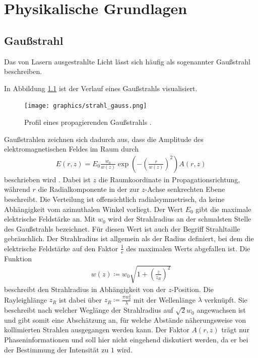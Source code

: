 \documentclass[
class=book,
accentcolor=1b,
custommargins=geometry,
fontsize=11pt,
thesis={type=Versuchsanleitung},
ruledheaders=all,
headline=false,
instbox=false,
marginpar=false,
title=small,
ignore-missing-data=true,
twoside=false,
pdfa=false %
]{apqpub}
\begin{document}
	\tableofcontents
	
	\mainmatter
	\setcounter{page}{1}
	\chapter{Physikalische Grundlagen}
	\section{Gaußstrahl}
Das von Lasern ausgestrahlte Licht lässt sich häufig als sogenannter Gaußstrahl beschreiben.

In Abbildung \ref{fig:gauss} ist der Verlauf eines Gaußstrahls visualisiert.
\begin{figure}[H]
\centering
	\texttt{[image: graphics/strahl\_gauss.png]}
\caption{Profil eines propagierenden Gaußstrahls \protect\cite{gauss}.}
\label{fig:gauss}
\end{figure}
Gaußstrahlen zeichnen sich dadurch aus, dass die Amplitude des elektromagnetischen Feldes im Raum durch 
\begin{align*}
E \left (r, z\right) = E_0 \frac{w_0}{w\left( z \right)} 
\exp \left( - \left( \frac{r}{w \left( z \right)} \right)^2 \right) 
A \left( r, z \right)
\end{align*}
beschrieben wird \cite[S. 50 -- 52]{Meschede}.
Dabei ist $z$ die Raumkoordinate in Propagationsrichtung, während $r$ die Radialkomponente in der zur $z$-Achse senkrechten Ebene beschreibt.
Die Verteilung ist offensichtlich radialsymmetrisch, da keine Abhängigkeit vom azimuthalen Winkel vorliegt.
Der Wert $E_0$ gibt die maximale elektrische Feldstärke an.
Mit $w_0$ wird der Strahlradius an der schmalsten Stelle des Gaußstrahls bezeichnet.
Für diesen Wert ist auch der Begriff Strahltaille gebräuchlich. 
Der Strahlradius ist allgemein als der Radius definiert, bei dem die elektrische Feldstärke auf den Faktor $\frac{1}{\mathrm{e}}$ des maximalen Werts abgefallen ist.
Die Funktion 
\begin{align*}
w \left( z \right) \coloneqq w_0 \sqrt{1+\left(\frac{z}{z_R}\right)^2}
\end{align*}
beschreibt den Strahlradius in Abhängigkeit von der $z$-Position.
Die Rayleighlänge $z_R$ ist dabei über $z_R \coloneqq \frac{\pi w_0^2}{\lambda}$ mit der Wellenlänge $\lambda$ verknüpft.
Sie beschreibt nach welcher Weglänge der Strahlradius auf $\sqrt{2} w_0$ angewachsen ist und gibt somit eine Abschätzung an, für welche Abstände näherungsweise von kollimierten Strahlen ausgegangen werden kann.
Der Faktor $A\left( r, z \right)$ trägt nur Phaseninformationen und soll hier nicht eingehend diskutiert werden, da er bei der Bestimmung der Intensität zu $1$ wird.
\end{document}
